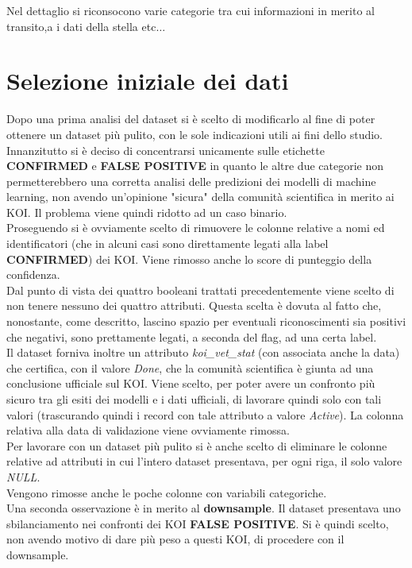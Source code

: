Nel dettaglio si riconsocono varie categorie tra cui informazioni in merito al 
transito,a i dati della stella etc$\ldots$

\section{Selezione iniziale dei dati}
Dopo una prima analisi del dataset si è scelto di modificarlo al fine di poter 
ottenere un dataset più pulito, con le sole indicazioni utili ai fini dello 
studio.\\
Innanzitutto si è deciso di concentrarsi unicamente sulle etichette 
\textbf{CONFIRMED} e \textbf{FALSE POSITIVE} in quanto le altre due categorie
non permetterebbero una corretta analisi delle predizioni dei modelli di machine
learning, non avendo un'opinione "sicura" della comunità scientifica in merito 
ai KOI. Il problema viene quindi ridotto ad un caso binario.\\
Proseguendo si è ovviamente scelto di rimuovere le colonne relative a nomi ed
identificatori (che in alcuni casi sono direttamente legati alla label 
\textbf{CONFIRMED}) dei KOI. Viene rimosso anche lo score di punteggio della 
confidenza. \\
Dal punto di vista dei quattro booleani trattati precedentemente viene scelto
di non tenere nessuno dei quattro attributi. Questa scelta è dovuta al fatto 
che, nonostante, come descritto, lascino spazio per eventuali riconoscimenti 
sia positivi che negativi, sono prettamente legati, a seconda del flag, ad una
certa label. \\
Il dataset forniva inoltre un attributo \textit{koi\_vet\_stat} (con associata 
anche la data) che certifica, con il valore \textit{Done}, che la comunità 
scientifica è giunta ad una conclusione ufficiale sul KOI. Viene scelto, per
poter avere un confronto più sicuro tra gli esiti dei modelli e i dati 
ufficiali, di lavorare quindi solo con tali valori (trascurando quindi i 
record con tale attributo a valore \textit{Active}). La colonna relativa alla 
data di validazione viene ovviamente rimossa.\\
Per lavorare con un dataset più pulito si è anche scelto di eliminare le colonne
relative ad attributi in cui l'intero dataset presentava, per ogni riga, il solo
valore \textit{NULL}.\\
Vengono rimosse anche le poche colonne con variabili categoriche.\\

Una seconda osservazione è in merito al \textbf{downsample}. Il dataset 
presentava uno sbilanciamento nei confronti dei KOI \textbf{FALSE POSITIVE}. Si 
è quindi scelto, non avendo motivo di dare più peso a questi KOI, di procedere 
con il downsample.

